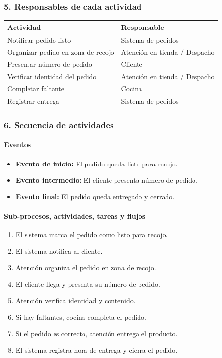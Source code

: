 \documentclass[a4paper,12pt]{article}
\begin{document}
\subsubsection*{5. Responsables de cada actividad}

\begin{longtable}{P{7cm} P{7cm}}
\toprule
\textbf{Actividad} & \textbf{Responsable} \\
\midrule
Notificar pedido listo & Sistema de pedidos \\
Organizar pedido en zona de recojo & Atención en tienda / Despacho \\
Presentar número de pedido & Cliente \\
Verificar identidad del pedido & Atención en tienda / Despacho \\
Completar faltante & Cocina \\
Registrar entrega & Sistema de pedidos \\
\bottomrule
\end{longtable}

\subsubsection*{6. Secuencia de actividades}

\paragraph{Eventos}

\begin{itemize}
    \item \textbf{Evento de inicio:} El pedido queda listo para recojo.
    \item \textbf{Evento intermedio:} El cliente presenta número de pedido.
    \item \textbf{Evento final:} El pedido queda entregado y cerrado.
\end{itemize}

\paragraph{Sub-procesos, actividades, tareas y flujos}

\begin{enumerate}
    \item El sistema marca el pedido como listo para recojo.
    \item El sistema notifica al cliente.
    \item Atención organiza el pedido en zona de recojo.
    \item El cliente llega y presenta su número de pedido.
    \item Atención verifica identidad y contenido.
    \item Si hay faltantes, cocina completa el pedido.
    \item Si el pedido es correcto, atención entrega el producto.
    \item El sistema registra hora de entrega y cierra el pedido.
\end{enumerate}
\end{document}
